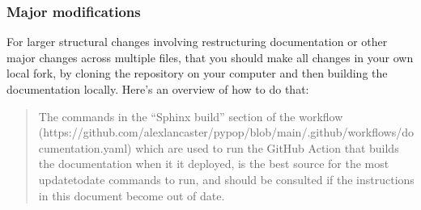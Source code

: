 \documentclass[letterpaper,10pt,english,openany,oneside]{sphinxmanual}
\begin{document}
\subsubsection{Major modifications}
\label{\detokenize{docs/guide-chapter-contributing:major-modifications}}
\sphinxAtStartPar
For larger structural changes involving restructuring documentation or
other major changes across multiple  files,  that you should make all changes in your own local fork,
by cloning the repository on your computer and then building the
documentation locally. Here’s an overview of how to do that:
\begin{quote}

\sphinxAtStartPar
The commands in the “Sphinx build” section of the workflow
 (https://github.com/alexlancaster/pypop/blob/main/.github/workflows/documentation.yaml)
which are used to run the GitHub Action that builds the documentation
when it it deployed, is the best source for the most update\sphinxhyphen{}to\sphinxhyphen{}date
commands to run, and should be consulted if the instructions in this
document become out of date.
\end{quote}
\end{document}
